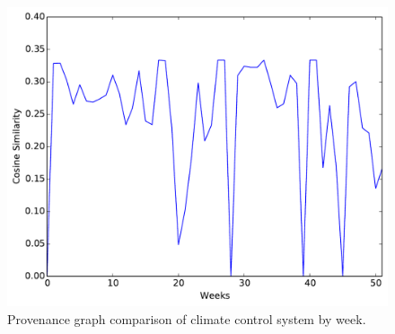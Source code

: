 \begin{figure}[tb]
\begin{center}
\includegraphics[width=\columnwidth]{foo.pdf}
\end{center}
\caption{Provenance graph comparison of climate control system by week.}
\label{figure}
\end{figure}



%




